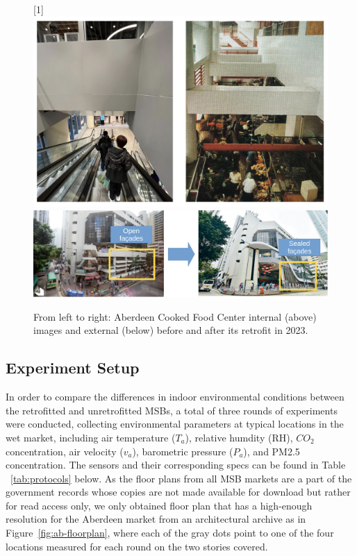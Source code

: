 \documentclass[preprint,12pt]{elsarticle}
\begin{document}
\begin{figure}[h!]
    \centering
    \scalebox{-1}[1]{\includegraphics[width=0.65\linewidth]{img/Aberdeenb4aft.png}}
    \includegraphics[width=0.7\linewidth]{img/open_to_close_facade.png}
    \caption{From left to right: Aberdeen Cooked Food Center internal (above) images and external (below) before and after its retrofit in 2023.}
    \label{fig:transition-ab}
\end{figure}

\subsection{Experiment Setup} 

    In order to compare the differences in indoor environmental conditions between the retrofitted and unretrofitted MSBs, a total of three rounds of experiments were conducted, collecting environmental parameters at typical locations in the wet market, including air temperature ($T_a$), relative humdity (RH), $CO_2$ concentration, air velocity ($v_a$), barometric pressure ($P_a$), and PM2.5 concentration. The sensors and their corresponding specs can be found in Table ~\ref{tab:protocols} below. As the floor plans from all MSB markets are a part of the government records whose copies are not made available for download but rather for read access only, we only obtained floor plan that has a high-enough resolution for the Aberdeen market from an architectural archive as in Figure~\ref{fig:ab-floorplan}, where each of the gray dots point to one of the four locations measured for each round on the two stories covered.
\end{document}
